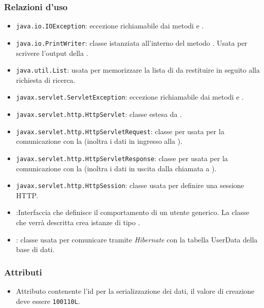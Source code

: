 \subsubsection*{Relazioni d'uso}

\begin{itemize}
	\item \texttt{java.io.IOException}: eccezione richiamabile dai metodi  e .
	\item \texttt{java.io.PrintWriter}: classe istanziata all'interno del metodo . Usata per scrivere l'output della .
	\item \texttt{java.util.List}: usata per memorizzare la lista di  da restituire in seguito alla richiesta di ricerca.
	\item \texttt{javax.servlet.ServletException}: eccezione richiamabile dai metodi  e .
	\item \texttt{javax.servlet.http.HttpServlet}: classe estesa da .
	\item \texttt{javax.servlet.http.HttpServletRequest}:  classe per usata per la comunicazione con la  (inoltra i dati in ingresso alla ).
	\item \texttt{javax.servlet.http.HttpServletResponse}: classe per usata per la comunicazione con la  (inoltra i dati in uscita dalla chiamata a ).
	\item \texttt{javax.servlet.http.HttpSession}: classe usata per definire una sessione HTTP.
	\item {}:Interfaccia che definisce il comportamento di un utente generico. La classe che verrà descritta crea istanze di tipo .
	\item {}: classe usata per comunicare tramite \textit{Hibernate} con la tabella UserData della base di dati.
\end{itemize}

\subsubsection*{Attributi}

\begin{itemize}
	\item{}
	Attributo contenente l'id per la serializzazione dei dati, il valore di creazione deve essere \texttt{100110L}.
\end{itemize}

